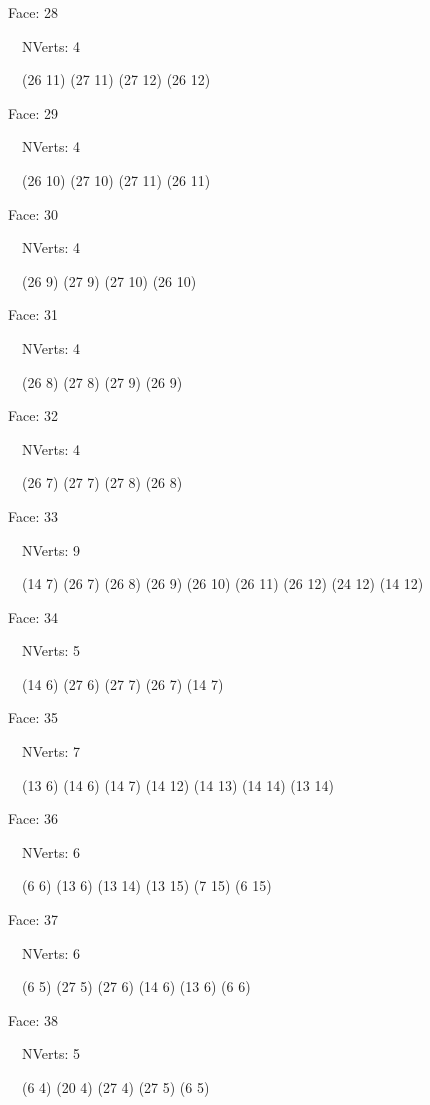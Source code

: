 \documentclass{article}
\begin{document}
{\footnotesize 

Face: 28

\   \    NVerts: 4

 \   \   (26 11) (27 11) (27 12) (26 12)}

{\footnotesize 

Face: 29

\   \    NVerts: 4

 \   \   (26 10) (27 10) (27 11) (26 11)}

{\footnotesize 

Face: 30

\   \    NVerts: 4

 \   \   (26 9) (27 9) (27 10) (26 10)}

{\footnotesize 

Face: 31

\   \    NVerts: 4

 \   \   (26 8) (27 8) (27 9) (26 9)}

{\footnotesize 

Face: 32

\   \    NVerts: 4

 \   \   (26 7) (27 7) (27 8) (26 8)}

{\footnotesize 

Face: 33

\   \    NVerts: 9

 \   \   (14 7) (26 7) (26 8) (26 9) (26 10) (26 11) (26 12) (24 12) (14 12)}

{\footnotesize 

Face: 34

\   \    NVerts: 5

 \   \   (14 6) (27 6) (27 7) (26 7) (14 7)}

{\footnotesize 

Face: 35

\   \    NVerts: 7

 \   \   (13 6) (14 6) (14 7) (14 12) (14 13) (14 14) (13 14)}

{\footnotesize 

Face: 36

\   \    NVerts: 6

 \   \   (6 6) (13 6) (13 14) (13 15) (7 15) (6 15)}

{\footnotesize 

Face: 37

\   \    NVerts: 6

 \   \   (6 5) (27 5) (27 6) (14 6) (13 6) (6 6)}

{\footnotesize 

Face: 38

\   \    NVerts: 5

 \   \   (6 4) (20 4) (27 4) (27 5) (6 5)}
\end{document}
